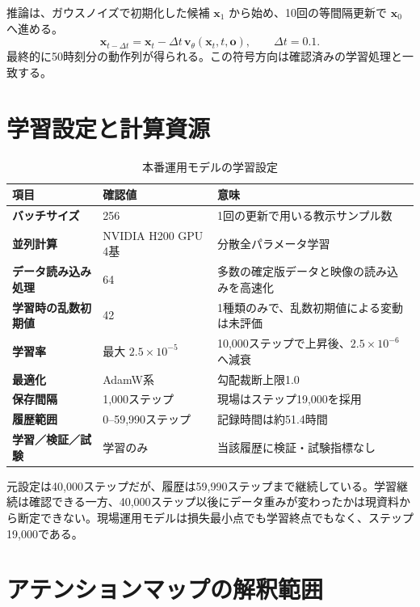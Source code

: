 推論は、ガウスノイズで初期化した候補 $\mathbf{x}_1$ から始め、10回の等間隔更新で $\mathbf{x}_0$ へ進める。
\[
\mathbf{x}_{t-\Delta t}
=\mathbf{x}_{t}-\Delta t\,\mathbf{v}_\theta(\mathbf{x}_t,t,\mathbf{o}),
\qquad \Delta t=0.1.
\]
最終的に50時刻分の動作列が得られる。この符号方向は確認済みの学習処理と一致する。

\section{学習設定と計算資源}

\begin{table}[H]
\centering
\caption{本番運用モデルの学習設定}
\begin{tabularx}{\textwidth}{>{\bfseries}p{37mm}p{38mm}X}
\toprule
項目 & 確認値 & 意味\\
\midrule
バッチサイズ & 256 & 1回の更新で用いる教示サンプル数\\
並列計算 & NVIDIA H200 GPU 4基 & 分散全パラメータ学習\\
データ読み込み処理 & 64 & 多数の確定版データと映像の読み込みを高速化\\
学習時の乱数初期値 & 42 & 1種類のみで、乱数初期値による変動は未評価\\
学習率 & 最大 $2.5\times10^{-5}$ & 10,000ステップで上昇後、$2.5\times10^{-6}$ へ減衰\\
最適化 & AdamW系 & 勾配裁断上限1.0\\
保存間隔 & 1,000ステップ & 現場はステップ19,000を採用\\
履歴範囲 & 0--59,990ステップ & 記録時間は約51.4時間\\
学習／検証／試験 & 学習のみ & 当該履歴に検証・試験指標なし\\
\bottomrule
\end{tabularx}
\end{table}

元設定は40,000ステップだが、履歴は59,990ステップまで継続している。学習継続は確認できる一方、40,000ステップ以後にデータ重みが変わったかは現資料から断定できない。現場運用モデルは損失最小点でも学習終点でもなく、ステップ19,000である。

\section{アテンションマップの解釈範囲}


